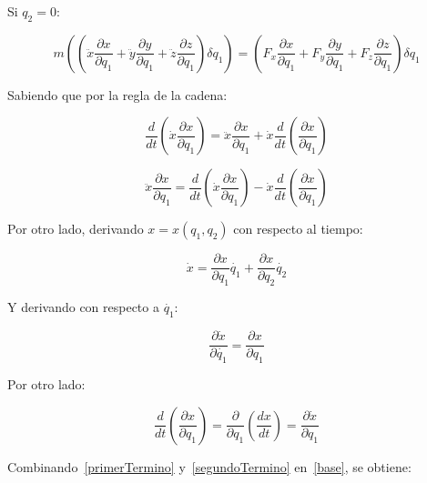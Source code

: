 Si $q_2=0$:

\begin{equation}
    m\left(
        \left(
            \ddot{x}\frac{\partial x}{\partial q_1}+
            \ddot{y}\frac{\partial y}{\partial q_1}+
            \ddot{z}\frac{\partial z}{\partial q_1}
        \right)\delta q_1
    \right)=
    \left(
        F_x\frac{\partial x}{\partial q_1}+
        F_y\frac{\partial y}{\partial q_1}+
        F_z\frac{\partial z}{\partial q_1}
    \right)\delta q_1
    \label{general1}
\end{equation}

Sabiendo que por la regla de la cadena:

\begin{equation*}
    \frac{d}{dt}\left(\dot{x}\frac{\partial x}{\partial q_1}\right)=
    \ddot{x}\frac{\partial x}{\partial q_1}+
    \dot{x}\frac{d}{dt}\left(\frac{\partial x}{\partial q_1}\right)
\end{equation*}

\begin{equation}
    \ddot{x}\frac{\partial x}{\partial q_1}=
    \frac{d}{dt}\left(\dot{x}\frac{\partial x}{\partial q_1}\right)-
    \dot{x}\frac{d}{dt}\left(\frac{\partial x}{\partial q_1}\right)
    \label{base}
\end{equation}

Por otro lado, derivando $x=x(q_1,q_2)$ con respecto al tiempo:

\begin{equation*}
    \dot{x}=\frac{\partial x}{\partial q_1}\dot{q_1}+
            \frac{\partial x}{\partial q_2}\dot{q_2}
\end{equation*}

Y derivando con respecto a $\dot{q_1}$:

\begin{equation}
    \frac{\partial \dot{x}}{\partial \dot{q_1}}=\frac{\partial x}{\partial q_1}
    \label{primerTermino}
\end{equation}

Por otro lado:

\begin{equation}
    \frac{d}{dt}\left(\frac{\partial x}{\partial q_1}\right)=
    \frac{\partial}{\partial q_1}\left(\frac{dx}{dt}\right)=
    \frac{\partial \dot{x}}{\partial q_1}
    \label{segundoTermino}
\end{equation}

Combinando~\ref{primerTermino} y~\ref{segundoTermino} en~\ref{base}, se obtiene:

